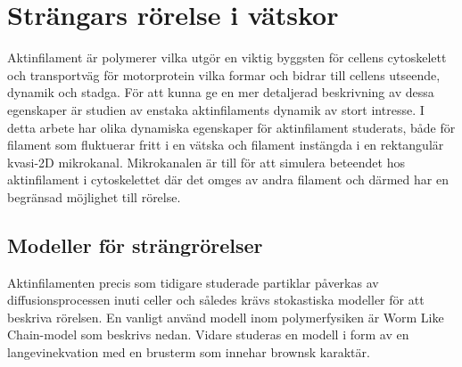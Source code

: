 \chapter{Strängars rörelse i vätskor}

Aktinfilament är polymerer vilka utgör en viktig byggsten för cellens cytoskelett och transportväg för motorprotein vilka formar och bidrar till cellens utseende, dynamik och stadga. För att kunna ge en mer detaljerad beskrivning av dessa egenskaper är studien av enstaka aktinfilaments dynamik av stort intresse. I detta arbete har olika dynamiska egenskaper för aktinfilament studerats, både för filament som fluktuerar fritt i en vätska och filament instängda i en rektangulär kvasi-2D mikrokanal. Mikrokanalen är till för att simulera beteendet hos aktinfilament i cytoskelettet där det omges av andra filament och därmed har en begränsad möjlighet till rörelse.



\section{Modeller för strängrörelser}
Aktinfilamenten precis som tidigare studerade partiklar påverkas av diffusionsprocessen inuti celler och således krävs stokastiska modeller för att beskriva rörelsen. En vanligt använd modell inom polymerfysiken är Worm Like Chain-model som beskrivs nedan. Vidare studeras en modell i form av en langevinekvation med en brusterm som innehar brownsk karaktär.

